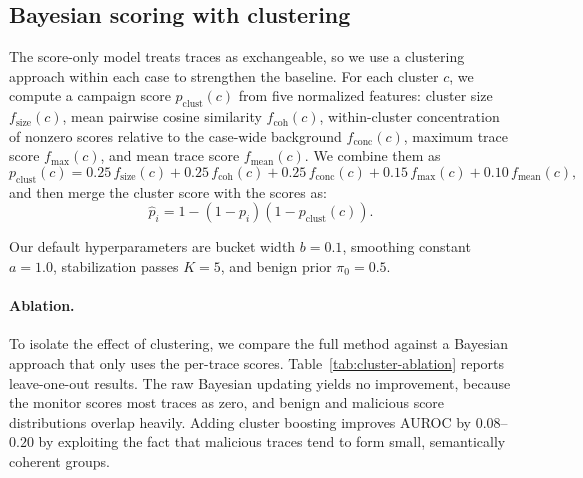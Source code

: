 \documentclass{article} %
\begin{document}
\subsection{Bayesian scoring with clustering}
\label{app:bayesian-cluster}

The score-only model treats traces as exchangeable, so we use a clustering approach within each case to strengthen the baseline. For each cluster $c$,
we compute a campaign score $p_{\mathrm{clust}}(c)$ from five normalized
features: cluster size $f_{\mathrm{size}}(c)$, mean pairwise cosine similarity
$ f_{\mathrm{coh}}(c)$, within-cluster concentration of nonzero scores relative
to the case-wide background $f_{\mathrm{conc}}(c)$, maximum trace score
$f_{\max}(c)$, and mean trace score $f_{\mathrm{mean}}(c)$. We combine them as
\begin{equation}
p_{\mathrm{clust}}(c)
=
0.25\,f_{\mathrm{size}}(c)
+
0.25\,f_{\mathrm{coh}}(c)
+
0.25\,f_{\mathrm{conc}}(c)
+
0.15\,f_{\max}(c)
+
0.10\,f_{\mathrm{mean}}(c),
\end{equation}
and then merge the cluster score with the scores as:
\begin{equation}
\hat{p}_i = 1 - (1-p_i)(1-p_{\mathrm{clust}}(c)).
\end{equation}

Our default hyperparameters are bucket width $b=0.1$, smoothing constant
$a=1.0$, stabilization passes $K=5$, and benign prior $\pi_0=0.5$.

\paragraph{Ablation.}
To isolate the effect of clustering, we compare the full method against
a Bayesian approach that only uses the per-trace scores.
Table~\ref{tab:cluster-ablation} reports leave-one-out results. The raw
Bayesian updating yields no improvement, because the monitor scores most traces as zero, and benign and malicious score distributions overlap heavily. Adding cluster boosting improves AUROC by $0.08$--$0.20$ by exploiting the fact that malicious traces tend to form small, semantically coherent groups.
\end{document}
